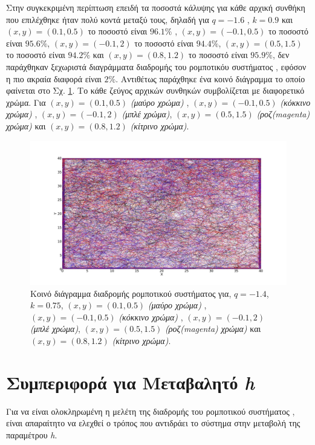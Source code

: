 Στην συγκεκριμένη περίπτωση επειδή τα ποσοστά κάλυψης για κάθε αρχική συνθήκη που επιλέχθηκε ήταν πολύ κοντά μεταξύ τους, δηλαδή  για $q =-1.6$ , $k = 0.9$ και $(x,y) = (0.1,0.5)$ το ποσοστό είναι $96.1\%$ , $(x,y) = (-0.1,0.5)$ το ποσοστό είναι $95.6\%$, $(x,y) = (-0.1,2)$ το ποσοστό είναι $94.4\%$, $(x,y) = (0.5,1.5)$ το ποσοστό είναι $94.2\%$ και $(x,y) = (0.8,1.2)$ το ποσοστό είναι $95.9\%$, δεν παράχθηκαν ξεχωριστά διαγράμματα διαδρομής του ρομποτικόυ συστήματος , εφόσον η πιο ακραία διαφορά είναι $2\%$.
Αντιθέτως παράχθηκε ένα κοινό διάγραμμα το οποίο φαίνεται στο Σχ. \ref{f:g99}. Το κάθε ζεύγος αρχικών συνθηκών συμβολίζεται με διαφορετικό χρώμα. Για $(x,y) = (0.1,0.5)$ \emph{(μαύρο χρώμα)} , $(x,y) = (-0.1,0.5)$ \emph{(κόκκινο χρώμα)} , $(x,y) = (-0.1,2)$ \emph{(μπλέ χρώμα)}, $(x,y) = (0.5,1.5)$ \emph{(ροζ(magenta) χρώμα)} και $(x,y) = (0.8,1.2)$ \emph{(κίτρινο χρώμα)}.

\begin{figure}[ht]
	\centering
	\includegraphics[width=1\linewidth]{LateX images/log/xy/g1}
	\caption{Κοινό διάγραμμα διαδρομής ρομποτικού συστήματος για, $q = -1.4$, $k = 0.75$, $(x,y) = (0.1,0.5)$ \emph{(μαύρο χρώμα)} , $(x,y) = (-0.1,0.5)$ \emph{(κόκκινο χρώμα)} , $(x,y) = (-0.1,2)$ \emph{(μπλέ χρώμα)}, $(x,y) = (0.5,1.5)$ \emph{(ροζ(magenta) χρώμα)} και $(x,y) = (0.8,1.2)$ \emph{(κίτρινο χρώμα)}.}
	\label{f:g99}	
\end{figure}

\clearpage


\section{Συμπεριφορά για Μεταβαλητό \emph{h}}
\label{sec:g4}
Για να είναι ολοκληρωμένη η μελέτη της διαδρομής του ρομποτικού συστήματος , είναι απαραίτητο να ελεχθεί ο τρόπος που αντιδράει το σύστημα στην μεταβολή της παραμέτρου \emph{h}.

